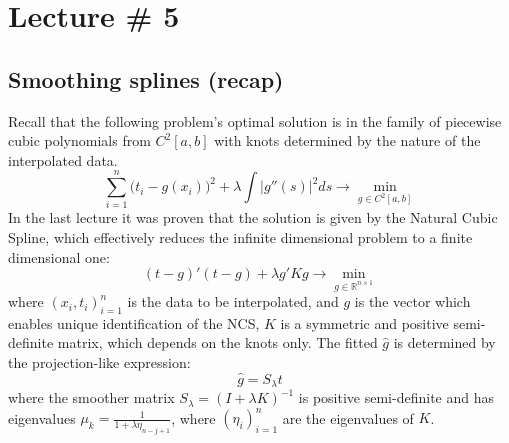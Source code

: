 \documentclass[a4paper]{article}
\newcommand{\Real}{\mathbb{R}}
\begin{document}







\clearpage
\section{Lecture \# 5} %
\label{sec:lecture_5}

\subsection{Smoothing splines (recap)} %
\label{sub:smoothing_splines_recap}

Recall that the following problem's optimal solution is in the family of piecewise
cubic polynomials from $C^2[a,b]$ with knots determined by the nature of the
interpolated data.
\[
\sum_{i=1}^n \bigl(t_i - g(x_i)\bigr)^2
+ \lambda \int |g''(s)|^2 ds
\to \min_{g\in C^2[a,b]}
\]
In the last lecture it was proven that the solution is given by the Natural Cubic
Spline, which effectively reduces the infinite dimensional problem to a finite
dimensional one:
\[(t-g)'(t-g) + \lambda g' K g\to \min_{g\in \Real^{n\times 1}}\]
where $(x_i, t_i)_{i=1}^n$ is the data to be interpolated, and $g$ is the vector
which enables unique identification of the NCS, $K$ is a symmetric and positive
semi-definite matrix, which depends on the knots only. The fitted $\hat{g}$ is
determined by the projection-like expression:
\[\hat{g} = S_\lambda t\]
where the smoother matrix $S_\lambda = ( I + \lambda K )^{-1}$ is positive
semi-definite and has eigenvalues $\mu_k = \frac{1}{1 + \lambda \eta_{n-j+1}}$,
where $(\eta_i)_{i=1}^n$ are the eigenvalues of $K$.
\end{document}
